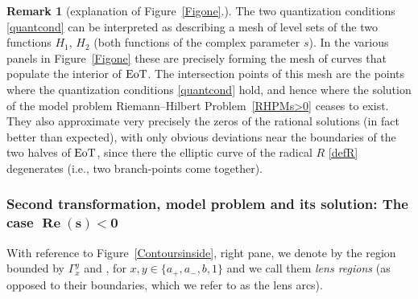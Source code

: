 \documentclass[pdftex]{sigma}
\numberwithin{equation}{section}
\theoremstyle{definition}
\newtheorem{Remark}[Theorem]{Remark}
\def \scr{\mathscr}
\def \Re{\operatorname{Re} }
\begin{document}
\begin{Remark}[explanation of Figure~\ref{Figone}.]
\label{remexp2}
The two quantization conditions \eqref{quantcond} can be interpreted as describing a mesh of level sets of the two functions $H_1$, $H_2$ (both functions of the complex parameter $s$). In the various panels in Figure~\ref{Figone} these are precisely forming the mesh of curves that populate the interior of ${\rm EoT}$. The intersection points of this mesh are the points where the quantization conditions \eqref{quantcond} hold, and hence where the solution of the model problem Riemann--Hilbert Problem~\ref{RHPMs>0} ceases to exist. They also approximate very precisely the zeros of the rational solutions (in fact better than expected), with only obvious deviations near the boundaries of the two halves of ${\rm EoT}$, since there the elliptic curve of the radical $R$ \eqref{defR} degenerates (i.e., two branch-points come together).
\end{Remark}


\subsubsection[Second transformation, model problem and its solution: The case $\Re (s)<0$]{Second transformation, model problem and its solution: The case $\boldsymbol{\Re (s)<0}$}
\label{secmodels<0}

 With reference to Figure~\ref{Contoursinside}, right pane, we denote by  the region bounded by $\Gamma_x^y$ and \smash{$\scr L_\pm^{(x,y)}$}, for $x,y\in \{a_+,a_-,b,1\}$ and we call them {\it lens regions} (as opposed to their boundaries, which we refer to as the lens arcs).
\end{document}
